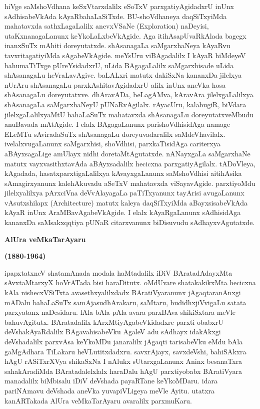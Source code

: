\documentclass[11pt,a4size]{article}
\begin{document}
hiVge saMshoVdhana keSxVtarxdalilx eSoTxV parxgatiyAgidadxrU inUnx
sAdhisabeVkAda kAyaRbahaLaSiTxde. BU-shoVdhaneya daqSiTxyiMda
mahatavxda sathxLagaLalilx anevxVSaNe {\rm (Exploration)} naDeyisi,
utaKxnanagaLanunx keYkoLaLxbeVkAgide. Aga itihAsapUvaRkAlada bagegx
inanxSuTx mAhiti doreyutatxde. shAsanagaLa saMgarxhaNeya kAyaRvu
tavxritagatiyiMda sAgabeVkAgide. meYsUru viBAgadalilx I kAyaR hiMdeyeV
bahumaTiTxge pUreYsidadxrU, uLida BAgagaLalilx saMgarxhisade uLida
shAsanagaLu heVraLavAgive. baLALxri matutx dakiSxNa kananxDa jilelxya
nUrAru shAsanagaLu parxkAshitavAgidadxrU alilx inUnx aneVka hosa
shAsanagaLu doreyutatxve. dhAravADa, beLagAMva, kAravAra
jilelxgaLalilxya shAsanagaLa saMgarxhaNeyU pUNaRvAgilalx. rAyacUru,
kalabugiR, biVdara jilelxgaLalilxyaMtU bahaLaSuTx mahatavxda
shAsanagaLu doreyutatxveMbudu anuBavada mAtAgide. I elalx BAgagaLanunx
parishoVdhisidAga namage ELeMTu sAviradaSuTx shAsanagaLu
doreyuvadaralilx saMdeVhavilalx. ivelalxvugaLanunx saMgarxhisi,
shoVdhisi, parxkaTisidAga cariterxya aBAyxsagaLige amUlayx nidhi
doretaMtAgutatxde. nANayxgaLa saMgarxhaNe matutx vayxvasithxtavAda
aBAyxsadalilx hecicxna parxgatiyAgilalx. tADoVleya, kAgadada,
hasatxparxtigaLalilxya kAvayxgaLanunx saMshoVdhisi aitihAsika
sAmagirxyanunx kalehAkuvadu aSeTxV mahatavxda
viSayavAgide. parxtiyoMdu jilelxyalilxya pArxciVna deVvAlayagaLa
paTiTxyanunx tayArisi avugaLanunx vAsutxshilapx {\rm (Architecture)}
matutx kaleya daqSiTxyiMda aBayxsisabeVkAda kAyaR inUnx
AraMBavAgabeVkAgide. I elalx kAyaRgaLanunx sAdhisidAga kananxDa
saMsakxqqtiya pUNaR citarxvanunx biDisuvudu sAdhayxvAgutatxde.

\bigskip
\begin{center}
\textbf{\huge{AlUra veMkaTarAyaru}}

\smallskip
\textbf{\large{(1880-1964)}}
\end{center}

\medskip
ipapxtatxneV shatamAnada modala haMtadalilx iDiV BAratadAdayxMta
sAvxtaMtarxyX hoVrATada bisi haraDitutx. oMdUvare shatakakikxMta
hecicxna kAla nishecxVSiTxta avasethxyalilxdadx BAratiVyaranunx
jAgaqtaranAnxgi mADalu bahaLaSuTx samAjasudhArakaru, saMtaru,
budidhxjiVvigaLu satata parxyatanx naDesidaru. lAla-bAla-pAla avara
parxBAva shikiSxtara meVle bahuvAgitutx. BAratadalilx
kArxMtiyAgabeVkidadxre parxti obabxrU deVshakAyaRdalilx
BAgavahisabeVku AgaleV adu \hbox{sAdhayx} idakAkxgi deVshadalilx parxvAsa
keYkoMDu janaralilx jAgaqti tarisabeVku eMdu bAla gaMgAdhara TiLakaru
heVLutitxdadxru. savxrAjayx, savxdeVshi, bahiSAkxra hAgU rASiTxrXVya
shikaSxNa I nAlukx sUtarxgaLanunx Aninx besanaTxra sahakAradiMda
BAratadalelxlalx haraDalu hAgU parxtiyobabx BAratiVyara manadalilx
biMbisalu iDiV deVshada payaRTane keYkoMDaru. idara pariNAmavu
deVshada aneVka yuvapiVLigeya meVle Ayitu. utatxra kanARTakada AlUra
veMkaTarAyaru avaralilx parxmuKaru. 
\end{document}
